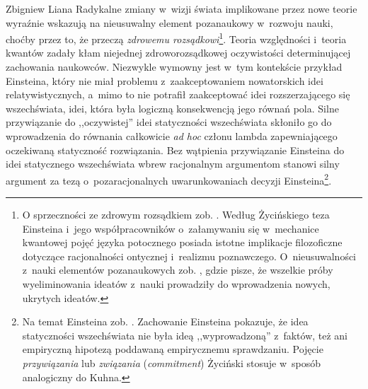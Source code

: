 \begin{artplenv}{Zbigniew Liana}
Radykalne zmiany w~wizji świata implikowane przez nowe teorie wyraźnie wskazują na nieusuwalny element pozanaukowy w~rozwoju
nauki, choćby przez to, że przeczą \textit{zdrowemu rozsądkowi}\footnote{O sprzeczności ze zdrowym rozsądkiem
zob.
\parencites[s.~249]{zycinski_jezyk_1983}[s.~176n]{zycinski_teizm_1985}.
Według Życińskiego teza Einsteina i~jego
współpracowników o~załamywaniu się w~mechanice kwantowej pojęć języka potocznego posiada istotne implikacje
filozoficzne dotyczące racjonalności ontycznej i~realizmu poznawczego. O~nieusuwalności z~nauki elementów pozanaukowych
zob.
\parencites[s.~34]{zycinski_structure_1988}[s.~60]{zycinski_struktura_2013},
gdzie pisze, że wszelkie próby wyeliminowania
ideatów z~nauki prowadziły do wprowadzenia nowych, ukrytych ideatów.}. Teoria względności i~teoria kwantów zadały kłam
niejednej zdroworozsądkowej oczywistości determinującej zachowania naukowców. Niezwykle wymowny jest w~tym kontekście 
przykład Einsteina, który nie miał problemu z~zaakceptowaniem nowatorskich idei relatywistycznych, a~mimo to nie
potrafił zaakceptować idei rozszerzającego się wszechświata, idei, która była logiczną konsekwencją jego równań pola.
Silne przywiązanie do ,,oczywistej'' idei statyczności wszechświata skłoniło go do wprowadzenia do równania całkowicie
\textit{ad hoc} członu lambda zapewniającego oczekiwaną statyczność rozwiązania. Bez wątpienia przywiązanie Einsteina do
idei statycznego wszechświata wbrew racjonalnym argumentom stanowi silny argument za tezą o~pozaracjonalnych
uwarunkowaniach decyzji \mbox{Einsteina}\footnote{Na temat Einsteina zob.
\parencites[s.~249]{zycinski_jezyk_1983}[s.~73]{zycinski_structure_1988}%
[s.~130]{zycinski_struktura_2013}[s.~189]{zycinski_elementy_1996}.
Zachowanie Einsteina pokazuje, że idea statyczności wszechświata nie była
ideą ,,wyprowadzoną'' z~faktów, też ani empiryczną hipotezą poddawaną empirycznemu sprawdzaniu. Pojęcie
\textit{przywiązania} lub \textit{związania} (\textit{commitment}) Życiński stosuje w~sposób analogiczny do Kuhna.}.


\end{artplenv}
